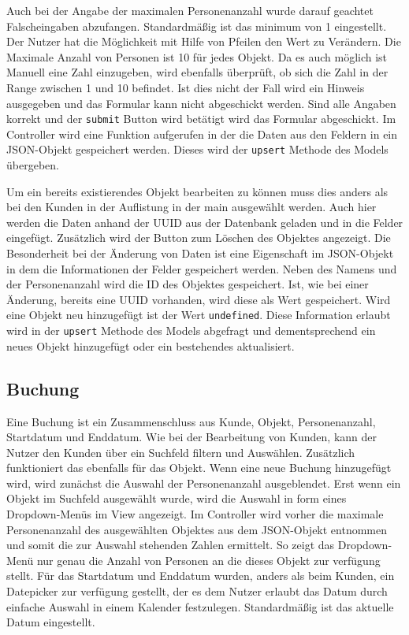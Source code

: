  Auch bei der Angabe der maximalen Personenanzahl wurde darauf geachtet Falscheingaben abzufangen. Standardmäßig ist das minimum von 1 eingestellt. Der Nutzer hat die Möglichkeit mit Hilfe von Pfeilen den Wert zu Verändern. Die Maximale Anzahl von Personen ist 10 für jedes Objekt. Da es auch möglich ist Manuell eine Zahl einzugeben, wird ebenfalls überprüft, ob sich die Zahl in der Range zwischen 1 und 10 befindet. Ist dies nicht der Fall wird ein Hinweis ausgegeben und das Formular kann nicht abgeschickt werden. Sind alle Angaben korrekt und der \texttt{submit} Button wird betätigt wird das Formular abgeschickt. Im Controller wird eine Funktion aufgerufen in der die Daten aus den Feldern in ein JSON-Objekt gespeichert werden. Dieses wird der \texttt{upsert} Methode des Models übergeben. 

Um ein bereits existierendes Objekt bearbeiten zu können muss dies anders als bei den Kunden in der Auflistung in der main ausgewählt werden. Auch hier werden die Daten anhand der UUID aus der Datenbank geladen und in die Felder eingefügt. Zusätzlich wird der Button zum Löschen des Objektes angezeigt. Die Besonderheit bei der Änderung von Daten ist eine Eigenschaft im JSON-Objekt in dem die Informationen der Felder gespeichert werden. Neben des Namens und der Personenanzahl wird die ID des Objektes gespeichert. Ist, wie bei einer Änderung, bereits eine UUID vorhanden, wird diese als Wert gespeichert. Wird eine Objekt neu hinzugefügt ist der Wert \texttt{undefined}. Diese Information erlaubt wird in der \texttt{upsert} Methode des Models abgefragt und dementsprechend ein neues Objekt hinzugefügt oder ein bestehendes aktualisiert.

  
\subsection{Buchung}
Eine Buchung ist ein Zusammenschluss aus Kunde, Objekt, Personenanzahl, Startdatum und Enddatum. Wie bei der Bearbeitung von Kunden, kann der Nutzer den Kunden über ein Suchfeld filtern und Auswählen. Zusätzlich funktioniert das ebenfalls für das Objekt. 
Wenn eine neue Buchung hinzugefügt wird, wird zunächst die Auswahl der Personenanzahl ausgeblendet. Erst wenn ein Objekt im Suchfeld ausgewählt wurde, wird die Auswahl in form eines Dropdown-Menüs im View angezeigt. Im Controller wird vorher die maximale Personenanzahl des ausgewählten Objektes aus dem JSON-Objekt entnommen und somit die zur Auswahl stehenden Zahlen ermittelt. So zeigt das Dropdown-Menü nur genau die Anzahl von Personen an die dieses Objekt zur verfügung stellt. Für das Startdatum und Enddatum wurden, anders als beim Kunden, ein Datepicker zur verfügung gestellt, der es dem Nutzer erlaubt das Datum durch einfache Auswahl in einem Kalender festzulegen. Standardmäßig ist das aktuelle Datum eingestellt.

